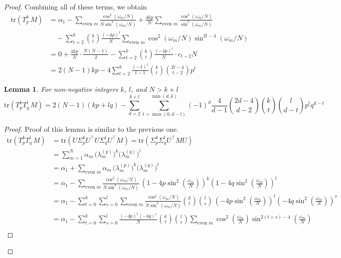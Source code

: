 \documentclass[12pt]{article}
\newtheorem{lemma}{Lemma}
\theoremstyle{definition}
\begin{document}
\begin{proof}
Combining all of these terms, we obtain
\begin{align*}
\mathrm{tr }(T_p^k\,M) &= \alpha_1 - \sum_{\text{even }m} \frac{\cos^2\left(\omega_m/N\right)}{N\sin^4\left(\omega_m/N\right)} + \frac{4kp}{N}\sum_{\text{even }m} \frac{\cos^2\left(\omega_m/N\right)}{\sin^2\left(\omega_m/N\right)}\\
&\quad -\sum_{t=2}^k\binom{k}{t}\frac{(-4p)^t}{N}\sum_{\text{even }m}\cos^2\left(\omega_m/N\right)\sin^{2t-4}\left(\omega_m/N\right)\\
&= 0 + \frac{4kp}{N}\cdot\frac{N(N-1)}{2}-\sum_{t=2}^k\binom{k}{t}\frac{(-4p)^t}{N}\cdot c_{t-2} N\\
&= 2(N-1)kp -4\sum_{t=2}^k\frac{(-1)^t}{t-1}\binom{k}{t} \binom{2t-4}{t-2}p^t 
\end{align*} 


\begin{lemma}
    For non-negative integers $k$, $l$, and $N> k + l$
    \[
\mathrm{tr }(T_p^kT_q^l\,M) =2(N-1)(kp+lq)  -\sum_{d=2}^{k+l}\sum_{t=\max(0,d-l)}^{\min(d,k)}(-1)^{d}\frac{4}{d-1} \binom{2d-4}{d-2}\binom{k}{t}\binom{l}{d-t}p^tq^{d-t}
\]
\end{lemma}
\begin{proof}
Proof of this lemma is similar to the previous one. 
\begin{align*}
\mathrm{tr }(T_p^kT_q^l\,M) &= 
\mathrm{tr} \left(  U \Sigma_p^k U^{\top}U \Sigma_q^l U^{\top} M \right)
= \mathrm{tr} \left(   \Sigma_p^k \Sigma_q^l U^{\top} M U \right)\\
&= \sum_{m=1}^{N} \alpha_m\,\bigl(\lambda^{(p)}_m\bigr)^k\bigl(\lambda^{(q)}_m\bigr)^l\\
&=\alpha_1 +\sum_{\text{even }m} \alpha_m\,\bigl(\lambda^{(p)}_m\bigr)^k\bigl(\lambda^{(q)}_m\bigr)^l\\
&= \alpha_1 -\sum_{\text{even }m} \frac{\cos^2\left(\omega_m/N\right)}{N\sin^4\left(\omega_m/N\right)}\,\left(1-4p\sin^2\left(\frac{\omega_m}{N}\right)\right)^k \left(1-4q\sin^2\left(\frac{\omega_m}{N}\right)\right)^l\\
&= \alpha_1 -\sum_{t=0}^k\sum_{s=0}^l\sum_{\text{even }m} \frac{\cos^2\left(\omega_m/N\right)}{N\sin^4\left(\omega_m/N\right)}\binom{k}{t}\binom{l}{s}\,\left(-4p\sin^2\left(\frac{\omega_m}{N}\right)\right)^t \left(-4q\sin^2\left(\frac{\omega_m}{N}\right)\right)^s\\
&= \alpha_1 -\sum_{t=0}^k\sum_{s=0}^l\frac{(-4p)^t(-4q)^s}{N}\binom{k}{t}\binom{l}{s}\sum_{\text{even }m}\cos^2\left(\frac{\omega_m}{N}\right)\sin^{2(t+s)-4}\left(\frac{\omega_m}{N}\right)\\

\end{align*}
\end{proof}
\end{proof}
\end{document}
